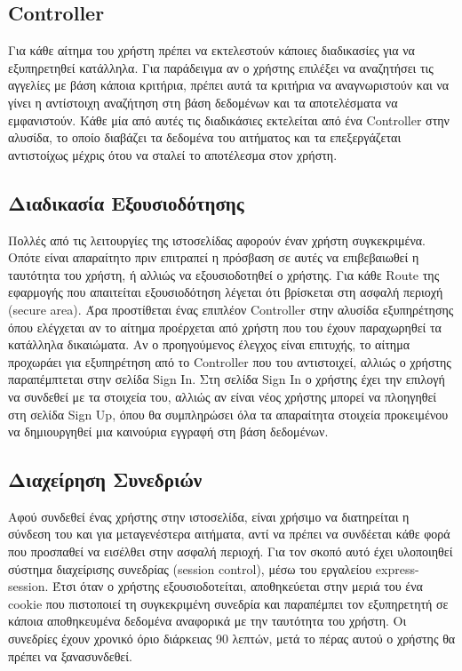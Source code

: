 \documentclass[manuscript,screen,review, language=greek, language=english]{acmart}
\begin{document}
\subsection{Controller}
	Για κάθε αίτημα του χρήστη πρέπει να εκτελεστούν κάποιες διαδικασίες για να
	εξυπηρετηθεί κατάλληλα. Για παράδειγμα αν ο χρήστης επιλέξει να αναζητήσει τις
	αγγελίες με βάση κάποια κριτήρια, πρέπει αυτά τα κριτήρια να αναγνωριστούν και να
	γίνει η αντίστοιχη αναζήτηση στη βάση δεδομένων και τα αποτελέσματα να εμφανιστούν.
	Κάθε μία από αυτές τις διαδικάσιες εκτελείται από ένα Controller στην αλυσίδα, το
	οποίο διαβάζει τα δεδομένα του αιτήματος και τα επεξεργάζεται αντιστοίχως μέχρις
	ότου να σταλεί το αποτέλεσμα στον χρήστη.


\subsection{Διαδικασία Εξουσιοδότησης}
	Πολλές από τις λειτουργίες της ιστοσελίδας αφορούν έναν χρήστη συγκεκριμένα. Οπότε
	είναι απαραίτητο πριν επιτραπεί η πρόσβαση σε αυτές να επιβεβαιωθεί η ταυτότητα του
	χρήστη, ή αλλιώς να εξουσιοδοτηθεί ο χρήστης. Για κάθε Route της εφαρμογής που
	απαιτείται εξουσιοδότηση λέγεται ότι βρίσκεται στη ασφαλή περιοχή (secure area). Άρα
	προστίθεται ένας επιπλέον Controller στην αλυσίδα εξυπηρέτησης όπου ελέγχεται αν το
	αίτημα προέρχεται από χρήστη που του έχουν παραχωρηθεί τα κατάλληλα δικαιώματα. Αν ο
	προηγούμενος έλεγχος είναι επιτυχής, το αίτημα προχωράει για εξυπηρέτηση από το
	Controller που του αντιστοιχεί, αλλιώς ο χρήστης παραπέμπτεται στην σελίδα Sign In.
	Στη σελίδα Sign In ο χρήστης έχει την επιλογή να συνδεθεί με τα στοιχεία του, αλλιώς
	αν είναι νέος χρήστης μπορεί να πλοηγηθεί στη σελίδα Sign Up, όπου θα συμπληρώσει όλα
	τα απαραίτητα στοιχεία προκειμένου να δημιουργηθεί μια καινούρια εγγραφή στη βάση
	δεδομένων.

\subsection{Διαχείρηση Συνεδριών}
	Αφού συνδεθεί ένας χρήστης στην ιστοσελίδα, είναι χρήσιμο να διατηρείται η σύνδεση
	του και για μεταγενέστερα αιτήματα, αντί να πρέπει να συνδέεται κάθε φορά που
	προσπαθεί να εισέλθει στην ασφαλή περιοχή. Για τον σκοπό αυτό έχει υλοποιηθεί σύστημα
	διαχείρισης συνεδρίας (session control), μέσω του εργαλείου express-session. Έτσι
	όταν ο χρήστης εξουσιοδοτείται, αποθηκεύεται στην μεριά του ένα cookie που πιστοποιεί
	τη συγκεκριμένη συνεδρία και παραπέμπει τον εξυπηρετητή σε κάποια αποθηκευμένα
	δεδομένα αναφορικά με την ταυτότητα του χρήστη. Οι συνεδρίες έχουν χρονικό όριο
	διάρκειας 90 λεπτών, μετά το πέρας αυτού ο χρήστης θα πρέπει να ξανασυνδεθεί.
\end{document}

